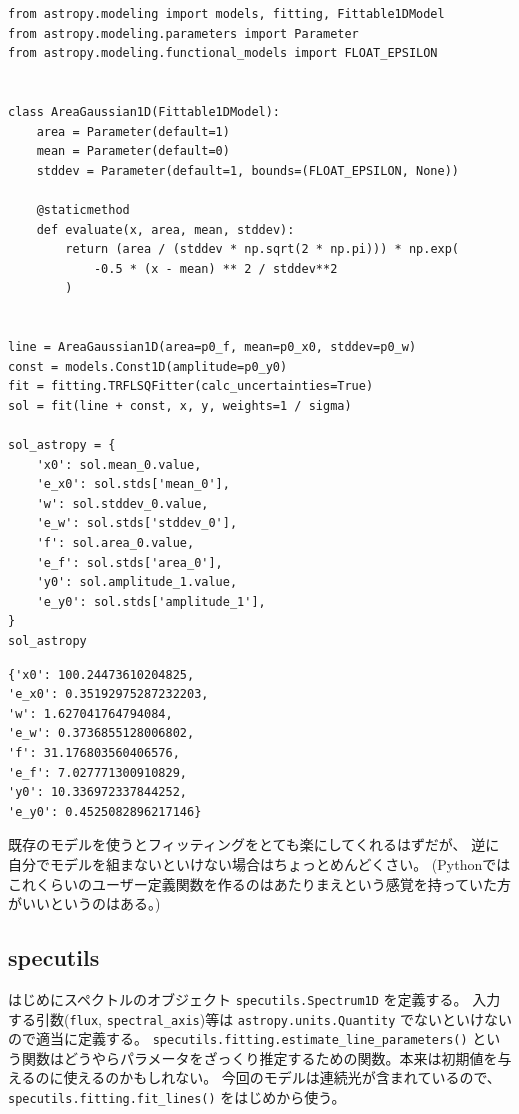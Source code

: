 \documentclass[a4paper, 8pt, notitlepage, uplatex, dvipdfmx]{jsarticle}
\begin{document}
\begin{verbatim}
from astropy.modeling import models, fitting, Fittable1DModel
from astropy.modeling.parameters import Parameter
from astropy.modeling.functional_models import FLOAT_EPSILON


class AreaGaussian1D(Fittable1DModel):
    area = Parameter(default=1)
    mean = Parameter(default=0)
    stddev = Parameter(default=1, bounds=(FLOAT_EPSILON, None))

    @staticmethod
    def evaluate(x, area, mean, stddev):
        return (area / (stddev * np.sqrt(2 * np.pi))) * np.exp(
            -0.5 * (x - mean) ** 2 / stddev**2
        )


line = AreaGaussian1D(area=p0_f, mean=p0_x0, stddev=p0_w)
const = models.Const1D(amplitude=p0_y0)
fit = fitting.TRFLSQFitter(calc_uncertainties=True)
sol = fit(line + const, x, y, weights=1 / sigma)

sol_astropy = {
    'x0': sol.mean_0.value,
    'e_x0': sol.stds['mean_0'],
    'w': sol.stddev_0.value,
    'e_w': sol.stds['stddev_0'],
    'f': sol.area_0.value,
    'e_f': sol.stds['area_0'],
    'y0': sol.amplitude_1.value,
    'e_y0': sol.stds['amplitude_1'],
}
sol_astropy
\end{verbatim}

\label{}
\begin{verbatim}
{'x0': 100.24473610204825,
'e_x0': 0.35192975287232203,
'w': 1.627041764794084,
'e_w': 0.3736855128006802,
'f': 31.176803560406576,
'e_f': 7.027771300910829,
'y0': 10.336972337844252,
'e_y0': 0.4525082896217146}
\end{verbatim}

既存のモデルを使うとフィッティングをとても楽にしてくれるはずだが、
逆に自分でモデルを組まないといけない場合はちょっとめんどくさい。
(Pythonではこれくらいのユーザー定義関数を作るのはあたりまえという感覚を持っていた方がいいというのはある。)
\subsection{specutils}
\label{sec:orgd9d6df7}
はじめにスペクトルのオブジェクト \texttt{specutils.Spectrum1D} を定義する。
入力する引数(\texttt{flux}, \texttt{spectral\_axis})等は \texttt{astropy.units.Quantity} でないといけないので適当に定義する。
\texttt{specutils.fitting.estimate\_line\_parameters()} という関数はどうやらパラメータをざっくり推定するための関数。本来は初期値を与えるのに使えるのかもしれない。
今回のモデルは連続光が含まれているので、 \texttt{specutils.fitting.fit\_lines()} をはじめから使う。
\end{document}
